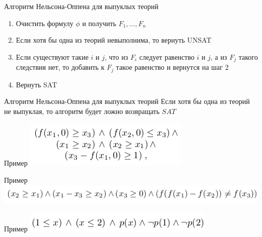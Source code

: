 \documentclass{beamer}
\begin{document}
\begin{frame}{Алгоритм Нельсона-Оппена для выпуклых теорий}
\begin{enumerate}
\item Очистить формулу $\phi$ и получить $F_1, \dots, F_n$
\item Если хотя бы одна из теорий невыполнима, то вернуть UNSAT
\item Если существуют такие $i$ и $j$, что из $F_i$ следует равенство $i$ и $j$, а из $F_j$ такого следствия нет, то добавить к
$F_j$ такое равенство и вернутся на шаг 2
\item Вернуть SAT
\end{enumerate}
\end{frame}

\begin{frame}{Алгоритм Нельсона-Оппена для выпуклых теорий}
Если хотя бы одна из теорий не выпуклая, то алгоритм будет ложно возвращать $SAT$
\end{frame}

\begin{frame}{Пример}
\includegraphics[scale=0.5]{ex2.png}\newline
\end{frame}

\begin{frame}{Пример}
\includegraphics[scale=0.5]{ex3.png}\newline
\end{frame}

\begin{frame}{Пример}
\includegraphics[scale=0.5]{ex4.png}\newline
\end{frame}
\end{document}
